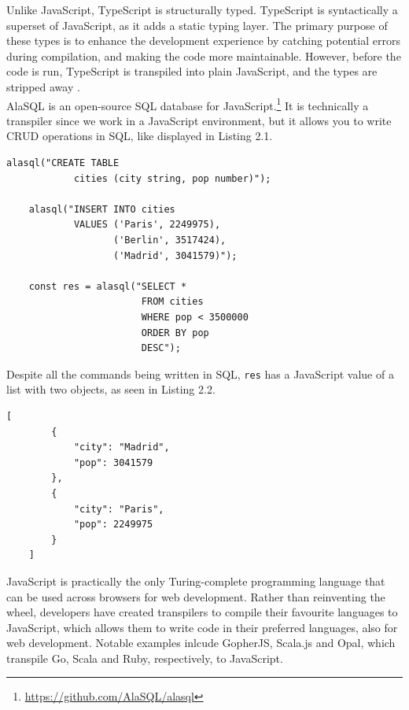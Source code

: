 Unlike JavaScript, TypeScript is structurally typed. TypeScript is syntactically a superset of JavaScript, as it adds a static typing layer. The primary purpose of these types is to enhance the development experience by catching potential errors during compilation, and making the code more maintainable. However, before the code is run, TypeScript is transpiled into plain JavaScript, and the types are stripped away \cite{TypeScript}. \hfill \\

AlaSQL is an open-source SQL database for JavaScript.\footnote{\url{https://github.com/AlaSQL/alasql}} It is technically a transpiler since we work in a JavaScript environment, but it allows you to write CRUD operations in SQL, like displayed in Listing 2.1. \hfill \\

\begin{lstlisting}[caption={JavaScript code to create, populate and select a table with AlaSQL}, captionpos=b]
    alasql("CREATE TABLE
            cities (city string, pop number)");

    alasql("INSERT INTO cities
            VALUES ('Paris', 2249975),
                   ('Berlin', 3517424),
                   ('Madrid', 3041579)");

    const res = alasql("SELECT *
                        FROM cities
                        WHERE pop < 3500000
                        ORDER BY pop
                        DESC");
\end{lstlisting}

Despite all the commands being written in SQL, \texttt{res} has a JavaScript value of a list with two objects, as seen in Listing 2.2. \hfill \\

\begin{lstlisting}[caption={JSON list with two objects}, captionpos=b]
    [
        {
            "city": "Madrid",
            "pop": 3041579
        },
        {
            "city": "Paris",
            "pop": 2249975
        }
    ]
\end{lstlisting}

JavaScript is practically the only Turing-complete programming language that can be used across browsers for web development. Rather than reinventing the wheel, developers have created transpilers to compile their favourite languages to JavaScript, which allows them to write code in their preferred languages, also for web development. Notable examples inlcude GopherJS, Scala.js and Opal, which transpile Go, Scala and Ruby, respectively, to JavaScript. \hfill \\

